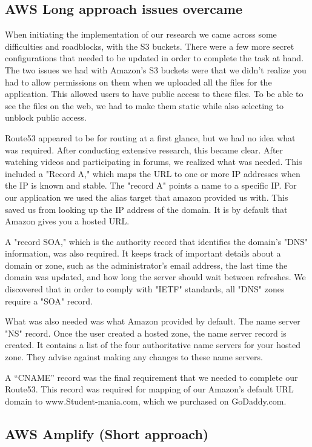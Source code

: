 \subsection{AWS Long approach issues overcame}

When initiating the implementation of our research we came across some difficulties and roadblocks, with the S3 buckets. There were a few more secret configurations that needed to be updated in order to complete the task at hand. The two issues we had with Amazon's S3 buckets were that we didn't realize you had to allow permissions on them when we uploaded all the files for the application. This allowed users to have public access to these files. To be able to see the files on the web, we had to make them static while also selecting to unblock public access.\hfill \break


Route53 appeared to be for routing at a first glance, but we had no idea what was required. After conducting extensive research, this became clear. After watching videos and participating in forums, we realized what was needed.
This included a "Record A," which maps the URL to one or more IP addresses when the IP is known and stable. 
The "record A" points a name to a specific IP. For our application we used the alias target that amazon provided us with. This saved us from looking up the IP address of the domain. It is by default that Amazon gives you a hosted URL.

A "record SOA," which is the authority record that identifies the domain's "DNS" information, was also required. It keeps track of important details about a domain or zone, such as the administrator's email address, the last time the domain was updated, and how long the server should wait between refreshes. We discovered that in order to comply with "IETF" standards, all "DNS" zones require a "SOA" record.

What was also needed was what Amazon provided by default. The name server "NS" record. Once the user created a hosted zone, the name server record is created. It contains a list of the four authoritative name servers for your hosted zone. They advise against making any changes to these name servers. 

A “CNAME” record was the final requirement that we needed to complete our Route53. This record was required for mapping of our Amazon's default URL domain to www.Student-mania.com, which we purchased on GoDaddy.com.


\subsection{AWS Amplify (Short approach) }

